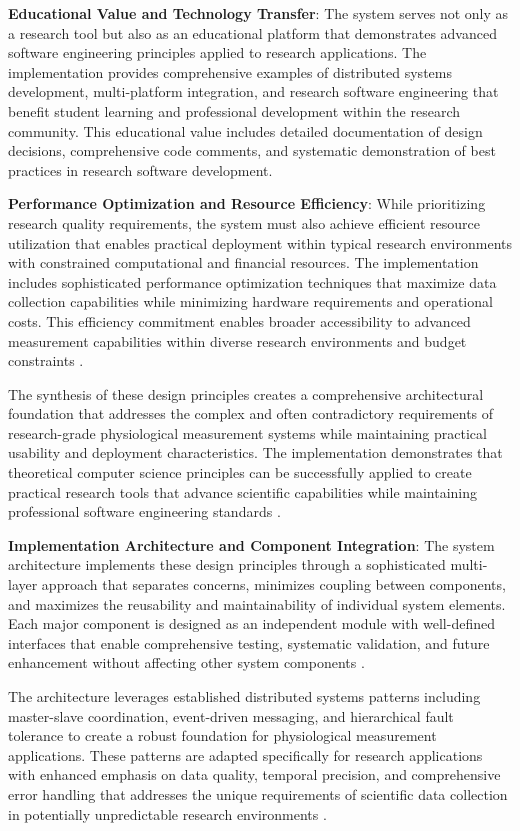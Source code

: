 \documentclass[11pt,a4paper]{article}
\begin{document}
\textbf{Educational Value and Technology Transfer}: The system serves not only as a research tool but also as an
educational platform that demonstrates advanced software engineering principles applied to research applications. The
implementation provides comprehensive examples of distributed systems development, multi-platform integration, and
research software engineering that benefit student learning and professional development within the research community.
This educational value includes detailed documentation of design decisions, comprehensive code comments, and systematic
demonstration of best practices in research software
development.

\textbf{Performance Optimization and Resource Efficiency}: While prioritizing research quality requirements, the system
must also achieve efficient resource utilization that enables practical deployment within typical research environments
with constrained computational and financial resources. The implementation includes sophisticated performance
optimization techniques that maximize data collection capabilities while minimizing hardware requirements and
operational costs. This efficiency commitment enables broader accessibility to advanced measurement capabilities within
diverse research environments and budget
constraints \cite{Chandra1996}.

The synthesis of these design principles creates a comprehensive architectural foundation that addresses the complex and
often contradictory requirements of research-grade physiological measurement systems while maintaining practical
usability and deployment characteristics. The implementation demonstrates that theoretical computer science principles
can be successfully applied to create practical research tools that advance scientific capabilities while maintaining
professional software engineering
standards \cite{Parnas1972}.

\textbf{Implementation Architecture and Component Integration}: The system architecture implements these design
principles through a sophisticated multi-layer approach that separates concerns, minimizes coupling between components,
and maximizes the reusability and maintainability of individual system elements. Each major component is designed as an
independent module with well-defined interfaces that enable comprehensive testing, systematic validation, and future
enhancement without affecting other system
components \cite{Garlan1993}.

The architecture leverages established distributed systems patterns including master-slave coordination, event-driven
messaging, and hierarchical fault tolerance to create a robust foundation for physiological measurement applications.
These patterns are adapted specifically for research applications with enhanced emphasis on data quality, temporal
precision, and comprehensive error handling that addresses the unique requirements of scientific data collection in
potentially unpredictable research
environments \cite{Avizienis2004}.



\end{document}
